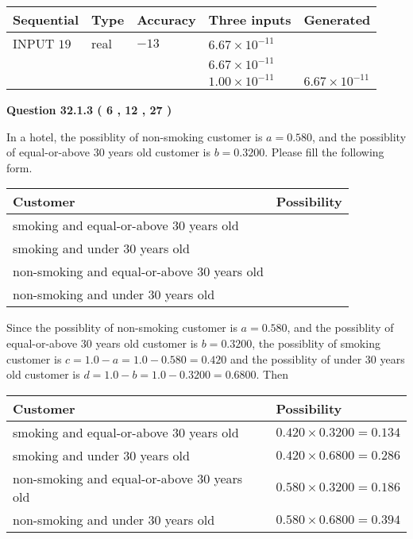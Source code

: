 \documentclass[12pt]{article}
\begin{document}
   
  
  
\noindent\begin{tabular}{|l|l|l|l|l|}
\hline
 Sequential & Type & Accuracy & Three inputs & Generated \\ 
\hline
 
 
  INPUT $           19 $ & real & $          -13  $ & $
 6.67 \times 10^{-11}
  $ & \\
  & & &  $
 6.67 \times 10^{-11}
  $ & \\
  & & &  $
 1.00 \times 10^{-11}
 $ & $ 6.67 \times 10^{-11} $ 
 \\  \hline  
 \end{tabular}
   
   
  
\vspace{0.2in}
  
{\textbf{\Large{Question
32.1.3 
 (           6 ,          12 ,          27 )
}}}
  
  
In a hotel, the possiblity of  %
non-smoking customer is
$a =  %
0.580$, and the possiblity of  %
equal-or-above 30 years old customer is $ b =  %
0.3200$.
Please fill the following form.
 
\noindent
\begin{tabular}{|l|l|}
\hline
Customer & Possibility \\
\hline
smoking  and   %
equal-or-above 30 years old  & \\
\hline
smoking  and   %
under 30 years old & \\
\hline
 non-smoking and   %
equal-or-above 30 years old  & \\
\hline
 non-smoking and  %
under 30 years old & \\
\hline
\end{tabular}
 
 
 
 
 
\noindent{}
 
 

Since the possiblity of  %
 non-smoking customer is $ a =  %
0.580 $,
and the possiblity of  %
equal-or-above 30 years old customer is $ b =  %
0.3200 $,
the possiblity of  %
smoking customer is $ c = 1.0 - a = 1.0 -
0.580
=  %
0.420 $ and the possiblity of  %
under 30 years old
customer is $ d = 1.0 - b = 1.0 -  %
0.3200 =  %
0.6800  $.
Then
 
\noindent
\begin{tabular}{|l|l|}
\hline
Customer & Possibility \\
\hline
smoking  and  %
equal-or-above 30 years old  &
  $ %
0.420 \times  %
0.3200 =  %
0.134$ \\
\hline
smoking  and  %
under 30 years old &
  $ %
0.420 \times  %
0.6800 =  %
0.286$ \\
\hline
 non-smoking and  %
equal-or-above 30 years old  &
  $ %
0.580 \times  %
0.3200 =  %
0.186$ \\
\hline
 non-smoking and  %
under 30 years old &
  $ %
0.580 \times  %
0.6800 =  %
0.394$ \\
\hline
\end{tabular}
 
\end{document}
